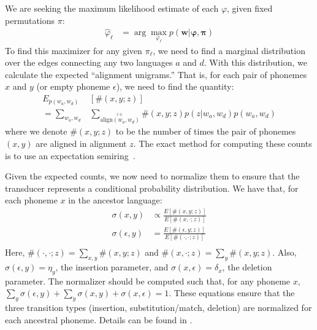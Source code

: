 \documentclass[11pt,a4paper]{article}
\begin{document}
We are seeking the maximum likelihood estimate of each $\varphi$, given
fixed permutations $\pi$:
\begin{equation*}
  \begin{split}
    \hat\varphi_{\ell} &= \arg\!\max_{\varphi_{\ell}} p(\mathbf w|\mathbf \varphi,\mathbf\pi)
   \end{split}
 \end{equation*}
To find this maximizer for any given $\pi_\ell$, we need to find a marginal
distribution over the edges connecting any two languages $a$ and
$d$. With this distribution, we calculate the expected ``alignment
unigrams.'' That is,  for each pair of phonemes $x$ and $y$ (or
empty phoneme $\epsilon$), we need to find the quantity:
\begin{equation*}
  \begin{split}
    E_{p(w_a,w_d)}&[\#(x,y;z)] \\ = \sum_{w_a,w_d} &\sum_{\stackrel{z\in}{\scriptscriptstyle\mathrm{align}(w_a,w_d)}} \#(x,y;z) p(z|w_a,w_d)p(w_a,w_d)
   \end{split}
 \end{equation*}
where we denote $\#(x,y;z)$ to be the number of times the pair of
phonemes $(x,y)$ are aligned in alignment $z$.  The exact method
for computing these counts is to use an expectation
semiring~\cite{eisner2001expectation}.

Given the expected counts, we now need to normalize them to ensure
that the transducer represents a conditional probability distribution.
We have that, for each phoneme $x$ in the ancestor language:
\begin{equation*}
  \begin{split}
    \sigma(x,y) &\propto \frac{E[\#(x,y;z)]}{E[\#(x,\cdot;z)]} \\
    \sigma(\epsilon,y) &= \frac{E[\#(\epsilon,y;z)]}{E[\#(\cdot,\cdot;z)]} \\
   \end{split}
 \end{equation*}
Here, $\#(\cdot,\cdot;z) = \sum_{x,y} \#(x,y;z)$ and $\#(x,\cdot;z)=\sum_y
\#(x,y;z)$. Also, $\sigma(\epsilon,y) = \eta_y$, the insertion
parameter, and $\sigma(x,\epsilon) = \delta_x$, the deletion
parameter. The normalizer should be computed such that, for any
phoneme $x$, $\sum_y \sigma(\epsilon,y) + \sum_y \sigma(x,y) +
\sigma(x,\epsilon) = 1$.  These equations ensure that the three
transition types (insertion, substitution/match, deletion) are
normalized for each ancestral phoneme. Details can be found in
.
\end{document}
